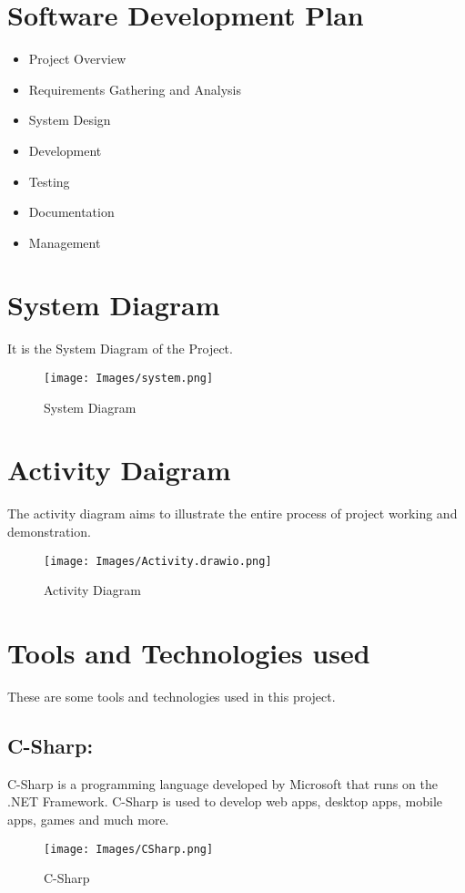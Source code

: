 \section{Software Development Plan}
\begin{itemize}
    \item Project Overview 
    \item Requirements Gathering and Analysis
    \item System Design
    \item Development
    \item Testing
    \item Documentation
    \item Management
\end{itemize}

\section{System Diagram}
It is the System Diagram of the Project.
\begin{figure}[h]
    \centering
    \texttt{[image: Images/system.png]}
    \caption{System Diagram}
\end{figure}
\newpage
\section{Activity Daigram}
The activity diagram aims to illustrate the entire process of project working and demonstration.
\begin{figure}[h]
    \centering
    \texttt{[image: Images/Activity.drawio.png]}
    \caption{Activity Diagram}
\end{figure}
\newpage
\section{Tools and Technologies used}
These are some tools and technologies used in this project.
\subsection{C-Sharp:}
C-Sharp is a programming language developed by Microsoft that runs on the .NET Framework. C-Sharp is used to develop web apps, desktop apps, mobile apps, games and much more.
\begin{figure}[h]
	\centering
	\texttt{[image: Images/CSharp.png]}
	\caption{C-Sharp\cite{csharp}}
\end{figure}
